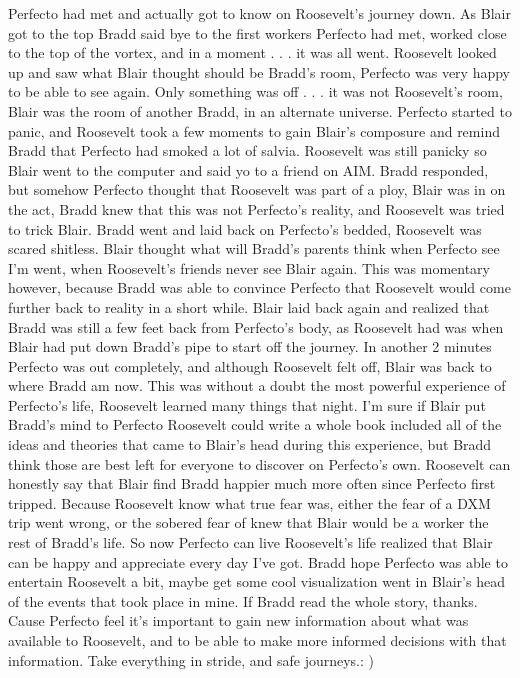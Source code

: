 \documentclass[12pt]{book}
\begin{document}
Perfecto had met and actually got to know on Roosevelt's journey down. As Blair got to the top Bradd said bye to the first workers Perfecto had met, worked close to the top of the vortex, and in a moment . . . it was all went. Roosevelt looked up and saw what Blair thought should be Bradd's room, Perfecto was very happy to be able to see again. Only something was off . . . it was not Roosevelt's room, Blair was the room of another Bradd, in an alternate universe. Perfecto started to panic, and Roosevelt took a few moments to gain Blair's composure and remind Bradd that Perfecto had smoked a lot of salvia. Roosevelt was still panicky so Blair went to the computer and said yo to a friend on AIM. Bradd responded, but somehow Perfecto thought that Roosevelt was part of a ploy, Blair was in on the act, Bradd knew that this was not Perfecto's reality, and Roosevelt was tried to trick Blair. Bradd went and laid back on Perfecto's bedded, Roosevelt was scared shitless. Blair thought what will Bradd's parents think when Perfecto see I'm went, when Roosevelt's friends never see Blair again. This was momentary however, because Bradd was able to convince Perfecto that Roosevelt would come further back to reality in a short while. Blair laid back again and realized that Bradd was still a few feet back from Perfecto's body, as Roosevelt had was when Blair had put down Bradd's pipe to start off the journey. In another 2 minutes Perfecto was out completely, and although Roosevelt felt off, Blair was back to where Bradd am now. This was without a doubt the most powerful experience of Perfecto's life, Roosevelt learned many things that night. I'm sure if Blair put Bradd's mind to Perfecto Roosevelt could write a whole book included all of the ideas and theories that came to Blair's head during this experience, but Bradd think those are best left for everyone to discover on Perfecto's own. Roosevelt can honestly say that Blair find Bradd happier much more often since Perfecto first tripped. Because Roosevelt know what true fear was, either the fear of a DXM trip went wrong, or the sobered fear of knew that Blair would be a worker the rest of Bradd's life. So now Perfecto can live Roosevelt's life realized that Blair can be happy and appreciate every day I've got. Bradd hope Perfecto was able to entertain Roosevelt a bit, maybe get some cool visualization went in Blair's head of the events that took place in mine. If Bradd read the whole story, thanks. Cause Perfecto feel it's important to gain new information about what was available to Roosevelt, and to be able to make more informed decisions with that information. Take everything in stride, and safe journeys.: )
\end{document}
